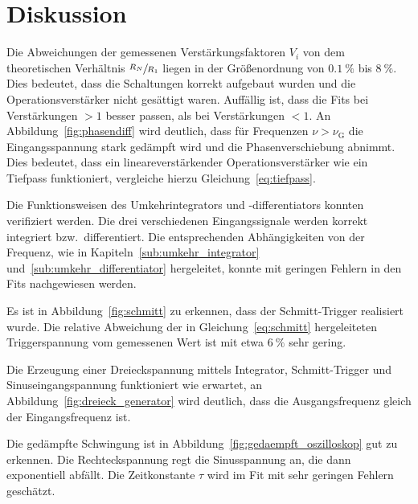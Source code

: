 \section{Diskussion}%
\label{sec:diskussion}


Die Abweichungen der gemessenen Verstärkungsfaktoren $V_i$
von dem theoretischen Verhältnis $\sfrac{R_N}{R_1}$ liegen
in der Größenordnung von $\SI{0.1}{\percent}$ bis $\SI{8}{\percent}$.
Dies bedeutet, dass die Schaltungen korrekt aufgebaut wurden und die Operationsverstärker nicht gesättigt waren.
Auffällig ist, dass die Fits bei Verstärkungen $> 1$ besser passen, als bei Verstärkungen $< 1$.
An Abbildung~\ref{fig:phasendiff} wird deutlich,
dass für Frequenzen $\nu > \nu_\text{G}$
die Eingangsspannung stark gedämpft wird und die Phasenverschiebung abnimmt.
Dies bedeutet, dass ein lineareverstärkender Operationsverstärker wie ein Tiefpass funktioniert, vergleiche hierzu Gleichung~\eqref{eq:tiefpass}.


Die Funktionsweisen des Umkehrintegrators und -differentiators konnten verifiziert werden.
Die drei verschiedenen Eingangssignale werden korrekt integriert bzw.\ differentiert.
Die entsprechenden Abhängigkeiten von der Frequenz, wie in Kapiteln~\ref{sub:umkehr_integrator} und~\ref{sub:umkehr_differentiator} hergeleitet,
konnte mit geringen Fehlern in den Fits nachgewiesen werden.

Es ist in Abbildung~\ref{fig:schmitt} zu erkennen,
dass der Schmitt-Trigger realisiert wurde.
Die relative Abweichung der in Gleichung~\eqref{eq:schmitt}
hergeleiteten Triggerspannung vom gemessenen Wert ist
mit etwa $\SI{6}{\percent}$ sehr gering.

Die Erzeugung einer Dreieckspannung mittels Integrator, Schmitt-Trigger und Sinuseingangspannung funktioniert wie erwartet,
an Abbildung~\ref{fig:dreieck_generator} wird deutlich,
dass die Ausgangsfrequenz gleich der Eingangsfrequenz ist.

Die gedämpfte Schwingung ist in Abbildung~\ref{fig:gedaempft_oszilloskop}
gut zu erkennen.
Die Rechteckspannung regt die Sinusspannung an,
die dann exponentiell abfällt.
Die Zeitkonstante $\tau$ wird im Fit mit sehr geringen Fehlern geschätzt.
